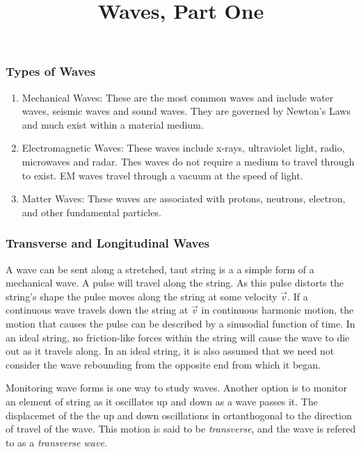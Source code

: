 \documentclass[english]{article}
\begin{document}
\title{Waves, Part One}

\maketitle

\subsubsection*{Types of Waves}
\begin{enumerate}
\item Mechanical Waves: These are the most common waves and include water
waves, seismic waves and sound waves. They are governed by Newton's
Laws and much exist within a material medium.
\item Electromagnetic Waves: These waves include x-rays, ultraviolet light,
radio, microwaves and radar. Thes waves do not require a medium to
travel through to exist. EM waves travel through a vacuum at the speed
of light.
\item Matter Waves: These waves are associated with protons, neutrons, electron,
and other fundamental particles.
\end{enumerate}

\subsubsection*{Transverse and Longitudinal Waves}

A wave can be sent along a stretched, taut string is a a simple form
of a mechanical wave. A pulse will travel along the string. As this
pulse distorts the string's shape the pulse moves along the string
at some velocity $\overrightarrow{v}.$ If a continuous wave travels
down the string at $\overrightarrow{v}$ in continuous harmonic motion,
the motion that causes the pulse can be described by a sinusodial
function of time. In an ideal string, no friction-like forces within
the string will cause the wave to die out as it travels along. In
an ideal string, it is also assumed that we need not consider the
wave rebounding from the opposite end from which it began.

Monitoring wave forms is one way to study waves. Another option is
to monitor an element of string as it oscillates up and down as a
wave passes it. The displacemet of the the up and down oscillations
in ortanthogonal to the direction of travel of the wave. This motion
is said to be \emph{transverse}, and the wave is refered to as a \emph{transverse
wave.} 
\end{document}
